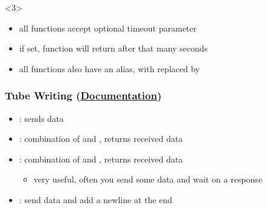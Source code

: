 \documentclass[aspectratio=169]{beamer}
\newcommand{\docl}[1]{(\textbf{\href{#1}{Documentation}})}
\begin{document}
{\begin{frame}[fragile]
\begin{onlyenv}
\begin{itemize}
\begin{itemize}
            \end{itemize}
        \end{itemize}
    \end{onlyenv}
    \begin{onlyenv}<3>
        \begin{itemize}
            \item all functions accept optional timeout parameter
            \item if set, function will return  after that many seconds
            \item all functions also have an alias, with  replaced by 
        \end{itemize}
    \end{onlyenv}

\end{frame}

\begin{frame}[fragile]
    \frametitle{Tube Writing \docl{http://docs.pwntools.com/en/stable/tubes.html\#pwnlib.tubes.tube.tube.send}}
    \begin{itemize}
        \item {}: sends data
        \item {}: combination of  and , returns received data
        \item {}: combination of  and , returns received data
        \begin{itemize}
            \item very useful, often you send some data and wait on a response
        \end{itemize}
        \item {}: send data and add a newline at the end
    \end{itemize}

\end{frame}

}
\end{document}

